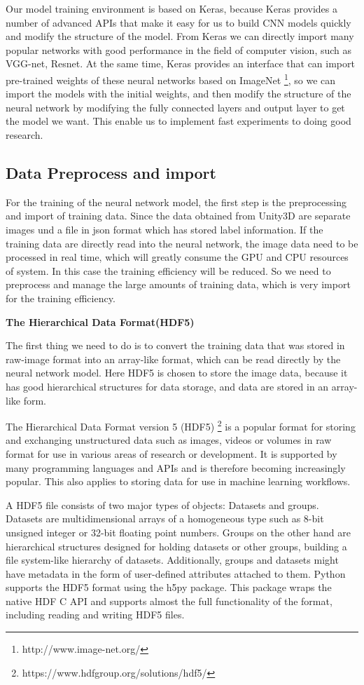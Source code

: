 Our model training environment is based on Keras, because Keras provides a number of advanced APIs that make it easy for us to build CNN models quickly and modify the structure of the model. From Keras we can directly import many popular networks with good performance in the field of computer vision, such as VGG-net, Resnet. At the same time, Keras provides an interface that can import pre-trained weights of these neural networks based on ImageNet \footnote{http://www.image-net.org/}, so we can import the models with the initial weights, and then modify the structure of the neural network by modifying the fully connected layers and output layer to get the model we want. This enable us to implement fast experiments to doing good research.

\subsection{Data Preprocess and import}
For the training of the neural network model, the first step is the preprocessing and import of training data. Since the data obtained from Unity3D are separate images und a file in json format which has stored label information. If the training data are directly read into the neural network, the image data need to be processed in real time, which will greatly consume the GPU and CPU resources of system. In this case the training efficiency will be reduced. So we need to preprocess and manage the large amounts of training data, which is very import for the training efficiency.

\textbf{The Hierarchical Data Format(HDF5)}

The first thing we need to do is to convert the training data that was stored in raw-image format into an array-like format, which can be read directly by the neural network model. Here HDF5 is chosen to store the image data, because it has good hierarchical structures for data storage, and data are stored in an array-like form.

The Hierarchical Data Format version 5 (HDF5) \footnote{https://www.hdfgroup.org/solutions/hdf5/} is a popular format for storing and exchanging unstructured data such as images, videos or volumes in raw format for use in various areas of research or development. It is supported by many programming languages and APIs and is therefore becoming increasingly popular. This also applies to storing data for use in machine learning workflows.

A HDF5 file consists of two major types of objects: Datasets and groups. Datasets are multidimensional arrays of a homogeneous type such as 8-bit unsigned integer or 32-bit floating point numbers. Groups on the other hand are hierarchical structures designed for holding datasets or other groups, building a file system-like hierarchy of datasets. Additionally, groups and datasets might have metadata in the form of user-defined attributes attached to them. Python supports the HDF5 format using the h5py package. This package wraps the native HDF C API and supports almost the full functionality of the format, including reading and writing HDF5 files.

